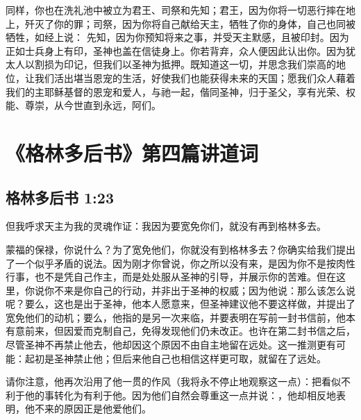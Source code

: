 同样，你也在洗礼池中被立为君王、司祭和先知；君王，因为你将一切恶行摔在地上，歼灭了你的罪；司祭，因为你将自己献给天主，牺牲了你的身体，自己也同被牺牲，如经上说：  先知，因为你预知将来之事，并受天主默感，且被印封。因为正如士兵身上有印，圣神也盖在信徒身上。你若背弃，众人便因此认出你。因为犹太人以割损为印记，但我们以圣神为抵押。既知道这一切，并思念我们崇高的地位，让我们活出堪当恩宠的生活，好使我们也能获得未来的天国；愿我们众人藉着我们的主耶稣基督的恩宠和爱人，与祂一起，偕同圣神，归于圣父，享有光荣、权能、尊崇，从今世直到永远，阿们。\par



\section{《格林多后书》第四篇讲道词}


\subsection{格林多后书 1:23}

但我呼求天主为我的灵魂作证：我因为要宽免你们，就没有再到格林多去。\par

蒙福的保禄，你说什么？为了宽免他们，你就没有到格林多去？你确实给我们提出了一个似乎矛盾的说法。因为刚才你曾说，你之所以没有来，是因为你不是按肉性行事，也不是凭自己作主，而是处处服从圣神的引导，并展示你的苦难。但在这里，你说你不来是你自己的行动，并非出于圣神的权威；因为他说：那么该怎么说呢？要么，这也是出于圣神，他本人愿意来，但圣神建议他不要这样做，并提出了宽免他们的动机；要么，他指的是另一次来临，并要表明在写前一封书信前，他本有意前来，但因爱而克制自己，免得发现他们仍未改正。也许在第二封书信之后，尽管圣神不再禁止他去，他却因这个原因不由自主地留在远处。这一推测更有可能：起初是圣神禁止他；但后来他自己也相信这样更可取，就留在了远处。\par

请你注意，他再次沿用了他一贯的作风（我将永不停止地观察这一点）：把看似不利于他的事转化为有利于他。因为他们自然会尊重这一点并说：，他却相反地表明，他不来的原因正是他爱他们。\par

